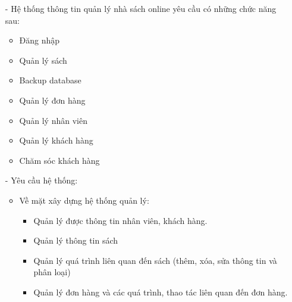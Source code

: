 \documentclass{report}
\begin{document}
\begin{enumerate}
    \item[- ] Hệ thống thông tin quản lý nhà sách online yêu cầu có những chức năng sau:
    \begin{itemize}
        \item Đăng nhập
        \item Quản lý sách
        \item Backup database
        \item Quản lý đơn hàng
        \item Quản lý nhân viên
        \item Quản lý khách hàng
        \item Chăm sóc khách hàng
    \end{itemize}
    
    \item[- ] Yêu cầu hệ thống:
    \begin{itemize}
        \item Về mặt xây dựng hệ thống quản lý:
        
        \begin{itemize}
            \item Quản lý được thông tin nhân viên, khách hàng.
            \item Quản lý thông tin sách
            \item Quản lý quá trình liên quan đến sách (thêm, xóa, sửa thông tin và phân loại)
            \item Quản lý đơn hàng và các quá trình, thao tác liên quan đến đơn hàng.
        \end{itemize}
        

\end{itemize}
\end{enumerate}
\end{document}
